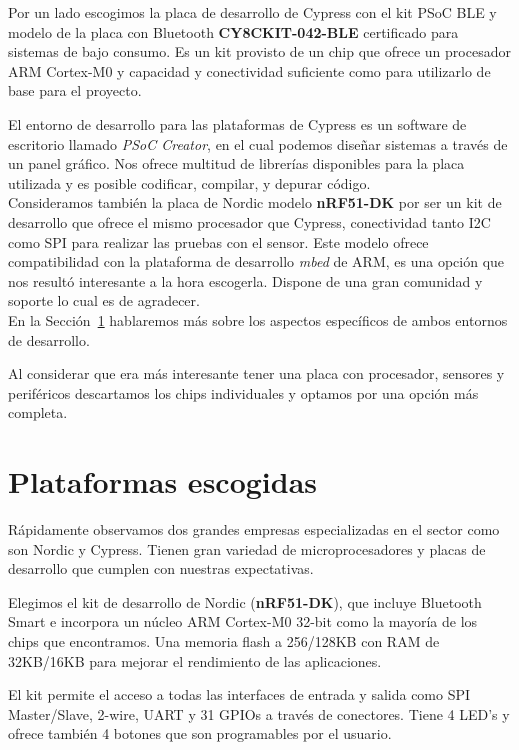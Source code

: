 Por un lado escogimos la placa de desarrollo de Cypress con el kit PSoC BLE y modelo de la placa con Bluetooth \textbf{CY8CKIT-042-BLE} certificado para sistemas de bajo consumo. Es un kit provisto de un chip que ofrece un procesador ARM Cortex-M0 y capacidad y conectividad suficiente como para utilizarlo de base para el proyecto.

El entorno de desarrollo para las plataformas de Cypress es un software de escritorio llamado \textit{PSoC Creator}, en el cual podemos diseñar sistemas a través de un panel gráfico. Nos ofrece multitud de librerías disponibles para la placa utilizada y es posible codificar, compilar, y depurar código.\\

Consideramos también la placa de Nordic modelo \textbf{nRF51-DK} por ser un kit de desarrollo que ofrece el mismo procesador que Cypress, conectividad tanto I2C como SPI para realizar las pruebas con el sensor. 
Este modelo ofrece compatibilidad con la plataforma de desarrollo \textit{mbed} de ARM, es una opción que nos resultó interesante a la hora escogerla. Dispone de una gran comunidad y soporte lo cual es de agradecer.\\

En la Sección~\ref{makereference3.4} hablaremos más sobre los aspectos específicos de ambos entornos de desarrollo.

Al considerar que era más interesante tener una placa con procesador, sensores y periféricos descartamos los chips individuales y optamos por una opción más completa.

\section{Plataformas escogidas}
\label{makereference3.4}

Rápidamente observamos dos grandes empresas especializadas en el sector como son Nordic y Cypress. Tienen gran variedad de microprocesadores y placas de desarrollo que cumplen con nuestras expectativas.

Elegimos el kit de desarrollo de Nordic (\textbf{nRF51-DK}), que incluye Bluetooth Smart e incorpora un núcleo ARM Cortex-M0 32-bit como la mayoría de los chips que encontramos. Una memoria flash a 256/128KB con RAM de 32KB/16KB para mejorar el rendimiento de las aplicaciones.

El kit permite el acceso a todas las interfaces de entrada y salida como SPI Master/Slave, 2-wire, UART y 31 GPIOs a través de conectores. Tiene 4 LED’s y ofrece también 4 botones que son programables por el usuario. 

